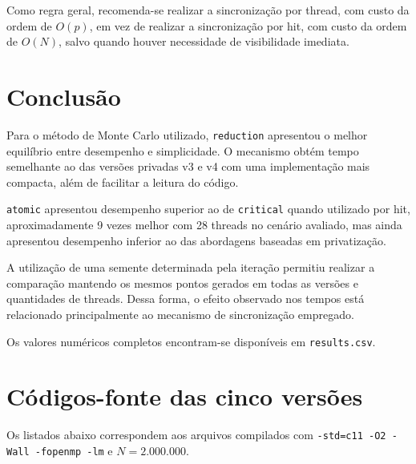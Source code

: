 \documentclass[11pt,letterpaper]{article}
\begin{document}
Como regra geral, recomenda-se realizar a sincronização por thread,
com custo da ordem de $O(p)$, em vez de realizar a sincronização por
hit, com custo da ordem de $O(N)$, salvo quando houver necessidade de
visibilidade imediata.

\section{Conclusão}

Para o método de Monte Carlo utilizado, \texttt{reduction} apresentou
o melhor equilíbrio entre desempenho e simplicidade. O mecanismo obtém
tempo semelhante ao das versões privadas v3 e v4 com uma implementação
mais compacta, além de facilitar a leitura do código.

\texttt{atomic} apresentou desempenho superior ao de \texttt{critical}
quando utilizado por hit, aproximadamente 9 vezes melhor com
28 threads no cenário avaliado, mas ainda apresentou desempenho
inferior ao das abordagens baseadas em privatização.

A utilização de uma semente determinada pela iteração
permitiu realizar a comparação mantendo os mesmos pontos gerados em
todas as versões e quantidades de threads. Dessa forma, o efeito
observado nos tempos está relacionado principalmente ao mecanismo de
sincronização empregado.

Os valores numéricos completos encontram-se disponíveis em
\texttt{results.csv}.

\appendix
\section{Códigos-fonte das cinco versões}

Os listados abaixo correspondem aos arquivos compilados com
\texttt{-std=c11 -O2 -Wall -fopenmp -lm} e $N=2.000.000$.










\end{document}

